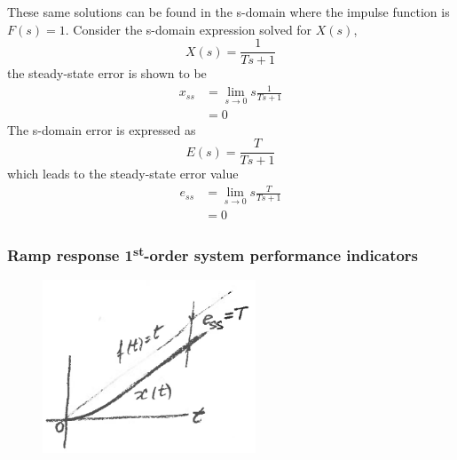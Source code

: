 \documentclass[12pt,letter]{article}
\numberwithin{ex}{section} %
\numberwithin{re}{section} %
\numberwithin{equation}{section}	%
\begin{document}
These same solutions can be found in the s-domain where the impulse function is $F(s)=1$. Consider the s-domain expression solved for $X(s)$, 
\begin{equation}
X(s) = \frac{1}{Ts +1} 
\end{equation}
the steady-state error is shown to be
\begin{align}
x_{ss} &= \lim\limits_{s \rightarrow 0} s \frac{1}{Ts+1}  \\
&= 0    \nonumber 
\end{align}
The s-domain error is expressed as
\begin{equation}
E(s) = \frac{T}{Ts +1} 
\end{equation}
which leads to the steady-state error value
\begin{align}
e_{ss} &= \lim\limits_{s \rightarrow 0}  s \frac{T}{Ts+1} \\
&= 0   \nonumber 
\end{align}







\subsubsection{Ramp response 1\textsuperscript{st}-order system performance indicators}

\begin{figure}[H]
	\centering
	\includegraphics[width=2.5in]{../figures/ramp_response_with_steady_state_error}
\end{figure}
\end{document}
